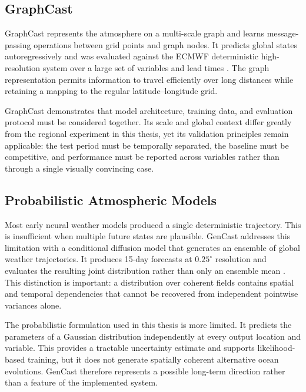 \subsection{GraphCast}

GraphCast represents the atmosphere on a multi-scale graph and learns message-passing operations between grid points and graph nodes. It predicts global states autoregressively and was evaluated against the ECMWF deterministic high-resolution system over a large set of variables and lead times \citep{lam2023graphcast}. The graph representation permits information to travel efficiently over long distances while retaining a mapping to the regular latitude--longitude grid.

GraphCast demonstrates that model architecture, training data, and evaluation protocol must be considered together. Its scale and global context differ greatly from the regional experiment in this thesis, yet its validation principles remain applicable: the test period must be temporally separated, the baseline must be competitive, and performance must be reported across variables rather than through a single visually convincing case.

\subsection{Probabilistic Atmospheric Models}

Most early neural weather models produced a single deterministic trajectory. This is insufficient when multiple future states are plausible. GenCast addresses this limitation with a conditional diffusion model that generates an ensemble of global weather trajectories. It produces 15-day forecasts at $0.25^{\circ}$ resolution and evaluates the resulting joint distribution rather than only an ensemble mean \citep{price2024gencast}. This distinction is important: a distribution over coherent fields contains spatial and temporal dependencies that cannot be recovered from independent pointwise variances alone.

The probabilistic formulation used in this thesis is more limited. It predicts the parameters of a Gaussian distribution independently at every output location and variable. This provides a tractable uncertainty estimate and supports likelihood-based training, but it does not generate spatially coherent alternative ocean evolutions. GenCast therefore represents a possible long-term direction rather than a feature of the implemented system.

